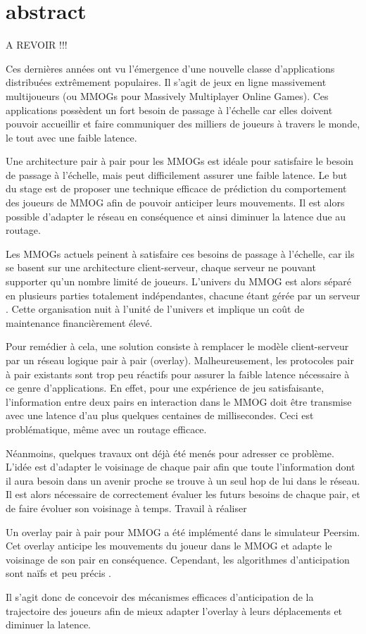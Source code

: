 \section{abstract}

A REVOIR !!!
	
Ces dernières années ont vu l’émergence d’une nouvelle classe d’applications distribuées extrêmement populaires. Il s’agit de jeux en ligne massivement multijoueurs (ou MMOGs pour Massively Multiplayer Online Games). Ces applications possèdent un fort besoin de passage à l’échelle car elles doivent pouvoir accueillir et faire communiquer des milliers de joueurs à travers le monde, le tout avec une faible latence.

Une architecture pair à pair pour les MMOGs est idéale pour satisfaire le besoin de passage à l’échelle, mais peut difficilement assurer une faible latence. Le but du stage est de proposer une technique efficace de prédiction du comportement des joueurs de MMOG afin de pouvoir anticiper leurs mouvements. Il est alors possible d’adapter le réseau en conséquence et ainsi diminuer la latence due au routage.

Les MMOGs actuels peinent à satisfaire ces besoins de passage à l’échelle, car ils se basent sur une architecture client-serveur, chaque serveur ne pouvant supporter qu’un nombre limité de joueurs. L’univers du MMOG est alors séparé en plusieurs parties totalement indépendantes, chacune étant gérée par un serveur . Cette organisation nuit à l’unité de l’univers et implique un coût de maintenance financièrement élevé.

Pour remédier à cela, une solution consiste à remplacer le modèle client-serveur par un réseau logique pair à pair (overlay). Malheureusement, les protocoles pair à pair existants sont trop peu réactifs pour assurer la faible latence nécessaire à ce genre d’applications. En effet, pour une expérience de jeu satisfaisante, l’information entre deux pairs en interaction dans le MMOG doit être transmise avec une latence d’au plus quelques centaines de millisecondes. Ceci est problématique, même avec un routage efficace.

Néanmoins, quelques travaux ont déjà été menés pour adresser ce problème. L’idée est d’adapter le voisinage de chaque pair afin que toute l’information dont il aura besoin dans un avenir proche se trouve à un seul hop de lui dans le réseau. Il est alors nécessaire de correctement évaluer les futurs besoins de chaque pair, et de faire évoluer son voisinage à temps.
Travail à réaliser

Un overlay pair à pair pour MMOG a été implémenté dans le simulateur Peersim. Cet overlay anticipe les mouvements du joueur dans le MMOG et adapte le voisinage de son pair en conséquence. Cependant, les algorithmes d’anticipation sont naïfs et peu précis .

Il s’agit donc de concevoir des mécanismes efficaces d’anticipation de la trajectoire des joueurs afin de mieux adapter l’overlay à leurs déplacements et diminuer la latence.
	
